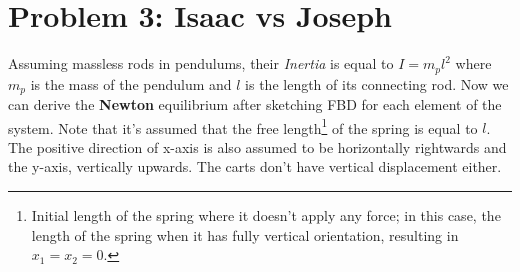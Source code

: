 \documentclass[conference]{IEEEtran}
\begin{document}


\vspace{35px}

\section{Problem 3: Isaac vs Joseph}
Assuming massless rods in pendulums, their \textit{Inertia} is equal to $I = m_p l^2$ where $m_p$ is the mass of the pendulum and $l$ is the length of its connecting rod.
Now we can derive the \textbf{Newton} equilibrium after sketching FBD for each element of the system. Note that it's assumed that the free length\footnote{Initial length of the spring where it doesn't apply any force; in this case, the length of the spring when it has fully vertical orientation, resulting in $x_1 = x_2 = 0$.} of the spring is equal to $l$. The positive direction of x-axis is also assumed to be horizontally rightwards and the y-axis, vertically upwards. The carts don't have vertical displacement either.
\end{document}
